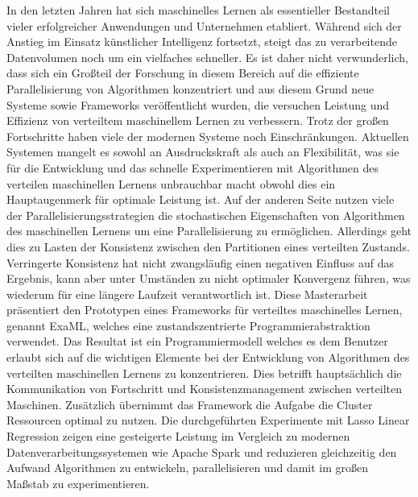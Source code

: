 % 
% 
%
\begin{abstractger}
In den letzten Jahren hat sich maschinelles Lernen als essentieller Bestandteil vieler erfolgreicher Anwendungen und Unternehmen etabliert.
W\"ahrend sich der Anstieg im Einsatz k\"unstlicher Intelligenz fortsetzt, steigt das zu verarbeitende Datenvolumen noch um ein vielfaches schneller.
Es ist daher nicht verwunderlich, dass sich ein Gro{\ss}teil der Forschung in diesem Bereich auf die effiziente Parallelisierung von Algorithmen konzentriert und aus diesem Grund neue Systeme sowie Frameworks ver\"offentlicht wurden, die versuchen Leistung und Effizienz von verteiltem maschinellem Lernen zu verbessern.
Trotz der gro{\ss}en Fortschritte haben viele der modernen Systeme noch Einschr\"ankungen.
Aktuellen Systemen mangelt es sowohl an Ausdruckskraft als auch an Flexibilit\"at, was sie f\"ur die Entwicklung und das schnelle Experimentieren mit Algorithmen des verteilen maschinellen Lernens unbrauchbar macht obwohl dies ein Hauptaugenmerk f\"ur optimale Leistung ist.
Auf der anderen Seite nutzen viele der Parallelisierungsstrategien die stochastischen Eigenschaften von Algorithmen des maschinellen Lernens um eine Parallelisierung zu erm\"oglichen.
Allerdings geht dies zu Lasten der Konsistenz zwischen den Partitionen eines verteilten Zustands.
Verringerte Konsistenz hat nicht zwangsl\"aufig einen negativen Einfluss auf das Ergebnis, kann aber unter Umst\"anden zu nicht optimaler Konvergenz f\"uhren, was wiederum f\"ur eine l\"angere Laufzeit verantwortlich ist.
Diese Masterarbeit pr\"asentiert den Prototypen eines Frameworks f\"ur verteiltes maschinelles Lernen, genannt ExaML, welches eine zustandszentrierte Programmierabstraktion verwendet.
Das Resultat ist ein Programmiermodell welches es dem Benutzer erlaubt sich auf die wichtigen Elemente bei der Entwicklung von Algorithmen des verteilten maschinellen Lernens zu konzentrieren.
Dies betrifft haupts\"achlich die Kommunikation von Fortschritt und Konsistenzmanagement zwischen verteilten Maschinen.
Zus\"atzlich \"ubernimmt das Framework die Aufgabe die Cluster Ressourcen optimal zu nutzen.
Die durchgef\"uhrten Experimente mit Lasso Linear Regression zeigen eine gesteigerte Leistung im Vergleich zu modernen Datenverarbeitungssystemen wie Apache Spark und reduzieren gleichzeitig den Aufwand Algorithmen zu entwickeln, parallelisieren und damit im gro{\ss}en Ma{\ss}stab zu experimentieren.
\end{abstractger}

